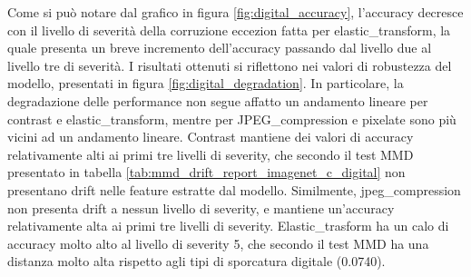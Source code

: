 Come si può notare dal grafico in figura \ref{fig:digital_accuracy}, l'accuracy decresce con il livello di severità della corruzione eccezion fatta per elastic\_transform, la quale presenta un breve incremento dell'accuracy passando dal livello due al livello tre di severità. I risultati ottenuti si riflettono nei valori di robustezza del modello, presentati in figura \ref{fig:digital_degradation}. In particolare, la degradazione delle performance non segue affatto un andamento lineare per contrast e elastic\_transform, mentre per JPEG\_compression e pixelate sono più vicini ad un andamento lineare.
Contrast mantiene dei valori di accuracy relativamente alti ai primi tre livelli di severity, che secondo il test MMD presentato in tabella \ref{tab:mmd_drift_report_imagenet_c_digital} non presentano drift nelle feature estratte dal modello. Similmente, jpeg\_compression non presenta drift a nessun livello di severity, e mantiene un'accuracy relativamente alta ai primi tre livelli di severity. Elastic\_trasform ha un calo di accuracy molto alto al livello di severity 5, che secondo il test MMD ha una distanza molto alta rispetto agli tipi di sporcatura digitale (0.0740). 
